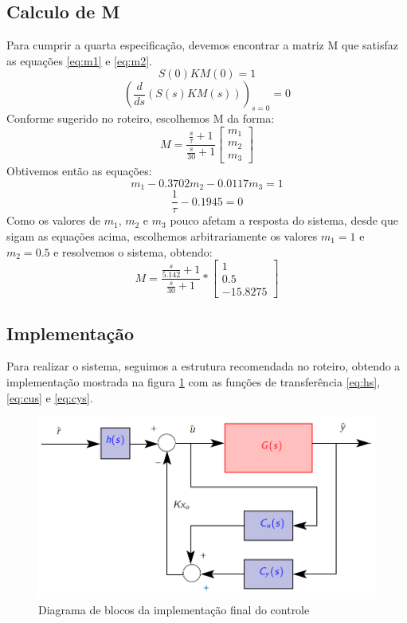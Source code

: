 \documentclass{article}
\begin{document}
\subsection{Calculo de M}
Para cumprir a quarta especificação, devemos encontrar a matriz M que satisfaz as equações \ref{eq:m1} e \ref{eq:m2}.
\begin{equation}
\label{eq:m1}
S(0)KM(0) = 1
\end{equation}
\begin{equation}
\label{eq:m2}
(\frac{d}{ds}(S(s)KM(s)))_{s=0}= 0
\end{equation}
Conforme sugerido no roteiro\cite{bb:roteiro}, escolhemos M da forma:
\begin{equation}
\label{eq:mlayout}
M = \frac{\frac{s}{\tau} + 1}{\frac{s}{30} + 1}\begin{bmatrix}
m_1\\
m_2\\
m_3
\end{bmatrix}
\end{equation}
Obtivemos então as equações:
\begin{equation}
	m_1 - 0.3702m_2 - 0.0117m_3 = 1
\end{equation}
\begin{equation}
	\frac{1}{\tau} - 0.1945 = 0
\end{equation}
Como os valores de $m_1$, $m_2$ e $m_3$ pouco afetam a resposta do sistema, desde que sigam as equações acima, escolhemos arbitrariamente os valores $m_1 = 1$ e $m_2 = 0.5$ e resolvemos o sistema, obtendo:
\begin{equation}
\label{eq:mvalor}
M = \frac{\frac{s}{5.142} + 1}{\frac{s}{30} + 1}*
\begin{bmatrix}
	1\\
	0.5\\
	-15.8275
\end{bmatrix}
\end{equation}

\subsection{Implementação}
Para realizar o sistema, seguimos a estrutura recomendada no roteiro\cite{bb:roteiro}, obtendo a implementação mostrada na figura \ref{fig:impl} com as funções de transferência \ref{eq:hs}, \ref{eq:cus} e \ref{eq:cys}.
\begin{figure}[H]
	\centering
	\includegraphics[width=0.8\linewidth]{impl}
	\caption{Diagrama de blocos da implementação final do controle}
	\label{fig:impl}
\end{figure}
\end{document}
